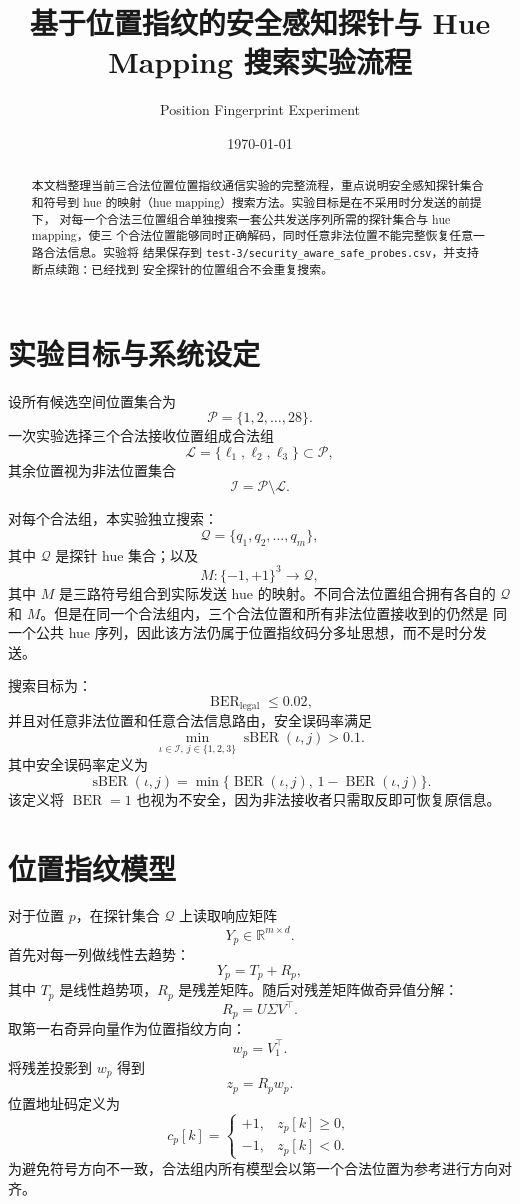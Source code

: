 \documentclass[UTF8,a4paper,11pt]{ctexart}
\title{基于位置指纹的安全感知探针与 Hue Mapping 搜索实验流程}
\author{Position Fingerprint Experiment}
\date{\today}
\newcommand{\BER}{\operatorname{BER}}
\newcommand{\sBER}{\operatorname{sBER}}
\begin{document}
\maketitle

\begin{abstract}
本文档整理当前三合法位置位置指纹通信实验的完整流程，重点说明安全感知探针集合
和符号到 hue 的映射（hue mapping）搜索方法。实验目标是在不采用时分发送的前提下，
对每一个合法三位置组合单独搜索一套公共发送序列所需的探针集合与 hue mapping，使三
个合法位置能够同时正确解码，同时任意非法位置不能完整恢复任意一路合法信息。实验将
结果保存到 \texttt{test-3/security\_aware\_safe\_probes.csv}，并支持断点续跑：已经找到
安全探针的位置组合不会重复搜索。
\end{abstract}

\section{实验目标与系统设定}

设所有候选空间位置集合为
\[
\mathcal{P}=\{1,2,\ldots,28\}.
\]
一次实验选择三个合法接收位置组成合法组
\[
\mathcal{L}=\{\ell_1,\ell_2,\ell_3\}\subset \mathcal{P},
\]
其余位置视为非法位置集合
\[
\mathcal{I}=\mathcal{P}\setminus\mathcal{L}.
\]

对每个合法组，本实验独立搜索：
\[
\mathcal{Q}=\{q_1,q_2,\ldots,q_m\},
\]
其中 $\mathcal{Q}$ 是探针 hue 集合；以及
\[
M:\{-1,+1\}^3\rightarrow \mathcal{Q},
\]
其中 $M$ 是三路符号组合到实际发送 hue 的映射。不同合法位置组合拥有各自的
$\mathcal{Q}$ 和 $M$。但是在同一个合法组内，三个合法位置和所有非法位置接收到的仍然是
同一个公共 hue 序列，因此该方法仍属于位置指纹码分多址思想，而不是时分发送。

搜索目标为：
\[
\BER_{\mathrm{legal}}\leq 0.02,
\]
并且对任意非法位置和任意合法信息路由，安全误码率满足
\[
\min_{\iota\in\mathcal{I},\,j\in\{1,2,3\}}
\sBER(\iota,j) > 0.1.
\]
其中安全误码率定义为
\[
\sBER(\iota,j)=\min\{\BER(\iota,j),\,1-\BER(\iota,j)\}.
\]
该定义将 $\BER=1$ 也视为不安全，因为非法接收者只需取反即可恢复原信息。

\section{位置指纹模型}

对于位置 $p$，在探针集合 $\mathcal{Q}$ 上读取响应矩阵
\[
Y_p\in\mathbb{R}^{m\times d}.
\]
首先对每一列做线性去趋势：
\[
Y_p = T_p + R_p,
\]
其中 $T_p$ 是线性趋势项，$R_p$ 是残差矩阵。随后对残差矩阵做奇异值分解：
\[
R_p=U\Sigma V^\top.
\]
取第一右奇异向量作为位置指纹方向：
\[
w_p = V_{1}^{\top}.
\]
将残差投影到 $w_p$ 得到
\[
z_p = R_p w_p.
\]
位置地址码定义为
\[
c_p[k]=
\begin{cases}
+1, & z_p[k]\geq 0,\\
-1, & z_p[k]<0.
\end{cases}
\]
为避免符号方向不一致，合法组内所有模型会以第一个合法位置为参考进行方向对齐。
\end{document}
